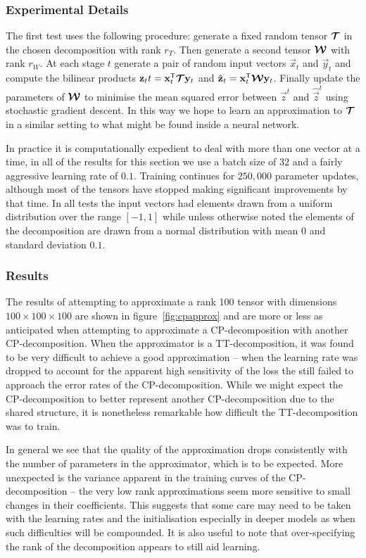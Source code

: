 \subsubsection{Experimental Details}
The first test uses the following procedure: generate a fixed random tensor \(\bm{\mathcal{T}}\)
in the chosen decomposition with rank \(r_T\). Then generate a second tensor \(\bm{\mathcal{W}}\) 
with rank \(r_W\). At each stage \(t\) generate a pair of random input vectors \(\vec{x}_t\) and
\(\vec{y}_t\) and compute the bilinear products 
\(\mathbf{z}_tt = \mathbf{x}_t^\mathsf{T}\bm{\mathcal{T}}\mathbf{y}_t\) and 
\(\hat{\mathbf{z}}_t = \mathbf{x}_t^\mathsf{T}\bm{\mathcal{W}}\mathbf{y}_t\). Finally update the parameters of
\(\bm{\mathcal{W}}\) to minimise the mean squared error between \(\vec{z}^t\) and \(\hat{\vec{z}}^t\)
using stochastic gradient descent. In this way we hope to learn an approximation to 
\(\bm{\mathcal{T}}\) in a similar setting to what might be found inside a neural network.

In practice it is computationally expedient to deal with more than one vector at a time, in
all of the results for this section we use a batch size of \(32\) and a fairly aggressive
 learning rate of \(0.1\).
Training continues for \(250,000\) parameter updates, although most of the tensors have stopped
making significant improvements by that time. In all tests the input vectors had elements drawn
from a uniform distribution over the range \([-1,1]\) while unless otherwise noted the elements of
the decomposition are drawn from a normal distribution with mean \(0\) and standard deviation
\(0.1\).

\subsubsection{Results}
The results of attempting to approximate a rank 100 tensor with dimensions 
\(100 \times 100 \times 100\) are shown in figure~\ref{fig:cpapprox} and are more or less
as anticipated when attempting to approximate a CP-decomposition with another CP-decomposition.
When the approximator is a TT-decomposition, it was found to be very difficult to achieve a
good approximation -- when the learning rate was dropped to account for the apparent high
sensitivity of the loss the still failed to approach the error rates of the CP-decomposition.
While we might expect the CP-decomposition to better represent another CP-decomposition due to
the shared structure, it is nonetheless remarkable how difficult the TT-decomposition was to
train.

In general we see that the quality of the approximation drops consistently with the
number of parameters in the approximator, which is to be expected. 
More unexpected is the variance apparent in the training
curves of the CP-decomposition -- the very low rank approximations seem more sensitive to small
 changes in their coefficients. This suggests that some care
may need to be taken with the learning rates and the initialisation especially in deeper models as
when such difficulties will be compounded.
It is also useful to note that over-specifying the rank of the decomposition
appears to still aid learning.

